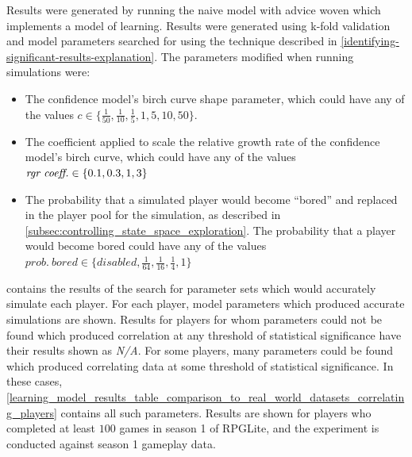 Results were generated by running the naive model with advice woven which implements a
model of learning. Results were generated using k-fold validation and model
parameters searched for using the technique described in
\cref{identifying-significant-results-explanation}. The parameters modified when
running simulations were:

\begin{itemize}
  \item The confidence model's birch curve shape parameter, which could have any
  of the values $c \in \{\frac{1}{50}, \frac{1}{10},
    \frac{1}{5}, 1, 5, 10, 50\}$.
    \item The coefficient applied to scale the relative growth rate of the
      confidence model's birch curve, which could have any of the values
      $\textrm{\emph{rgr~coeff.}} \in \{0.1, 0.3, 1, 3\}$
    \item The probability that a simulated player would become ``bored'' and
    replaced in the player pool for the simulation, as described in
    \cref{subsec:controlling_state_space_exploration}. The probability that a
    player would become bored could have any of the values $prob.~bored \in
    \{disabled, \frac{1}{64}, \frac{1}{16}, \frac{1}{4}, 1\}$
\end{itemize}

contains the results of the search for parameter sets which would accurately
simulate each player. For each player, model parameters which produced accurate
simulations are shown. Results for players for whom parameters could not be
found which produced correlation at any threshold of statistical significance
have their results shown as \emph{N/A}. For some players, many parameters could
be found which produced correlating data at some threshold of statistical
significance. In these cases,
\cref{learning_model_results_table_comparison_to_real_world_datasets_correlating_players}
contains all such parameters. Results are shown for players who completed at
least $100$ games in season 1 of RPGLite, and the experiment is conducted
against season 1 gameplay data.


